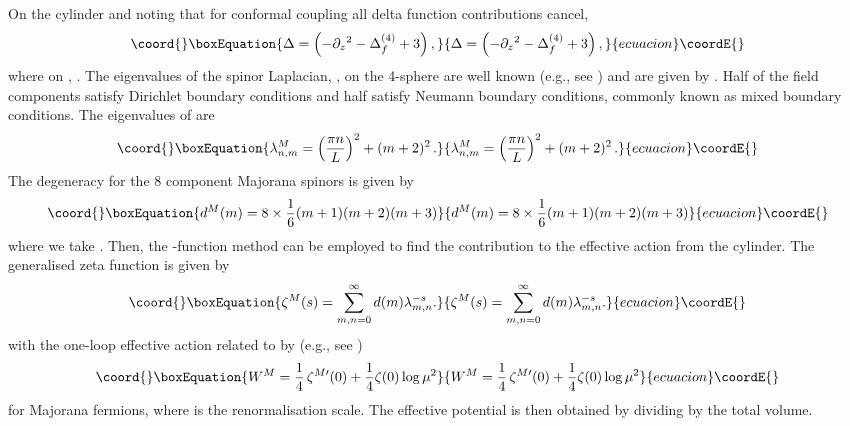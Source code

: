 \documentclass[a4paper,a4paper]{article}
\begin{document}
On the cylinder and noting that for conformal coupling all delta function contributions 
cancel,
\begin{equation}\coord{}\boxEquation{
\Delta=\left (-\partial_ z{}^2-\Delta^{(4)}_f+3\right),
\label{eigferm}
}{
\Delta=\left (-\partial_ z{}^2-\Delta^{(4)}_f+3\right),
}{ecuacion}\coordE{}\end{equation}
where on \coordHE{}, \coordHE{}.
The eigenvalues of the spinor Laplacian, \coordHE{}, on the 4-sphere 
are well known (e.g., see \cite{MOSS}) and are given by \coordHE{}. 
Half of the field components satisfy Dirichlet boundary conditions and half 
satisfy Neumann boundary conditions, commonly known as 
mixed boundary conditions. The eigenvalues of \myHighlight{$\Delta$}\coordHE{} are
\begin{equation}\coord{}\boxEquation{
\label{eig}
{\lambda_{n,m}^M}=\left(\frac{\pi n}{L}\right)^2+(m+2)^2\,.
}{
{\lambda_{n,m}^M}=\left(\frac{\pi n}{L}\right)^2+(m+2)^2\,.
}{ecuacion}\coordE{}\end{equation}
The degeneracy for the 8 component Majorana spinors is given by
\cite{MOSS}
\begin{equation}\coord{}\boxEquation{
d^M(m)=8\times\frac{1}{6}(m+1)(m+2)(m+3)
\label{degferm}
}{
d^M(m)=8\times\frac{1}{6}(m+1)(m+2)(m+3)
}{ecuacion}\coordE{}\end{equation}
where we take \coordHE{}. Then, the \myHighlight{$\zeta$}\coordHE{}-function method can be employed 
to find the contribution to the effective action from the cylinder. 
The generalised zeta function is given by
\begin{equation}\coord{}\boxEquation{
\label{gfunc}
\zeta^M(s)=\sum_{m,n=0}^\infty d(m) \lambda_{m,n}^{-s}.
}{
\zeta^M(s)=\sum_{m,n=0}^\infty d(m) \lambda_{m,n}^{-s}.
}{ecuacion}\coordE{}\end{equation}
with the one-loop effective action related to \coordHE{} by (e.g., see 
\cite{MOSS, BD})
\begin{equation}\coord{}\boxEquation{
\label{effact}
W^M=\frac{1}{4}\,\zeta^{M\prime}(0)+\frac{1}{4} \zeta(0) \log \mu^2
}{
W^M=\frac{1}{4}\,\zeta^{M\prime}(0)+\frac{1}{4} \zeta(0) \log \mu^2
}{ecuacion}\coordE{}\end{equation}
for Majorana fermions, where \myHighlight{$\mu$}\coordHE{} is the renormalisation scale. The 
effective potential is then obtained by dividing by the total volume.
\end{document}
